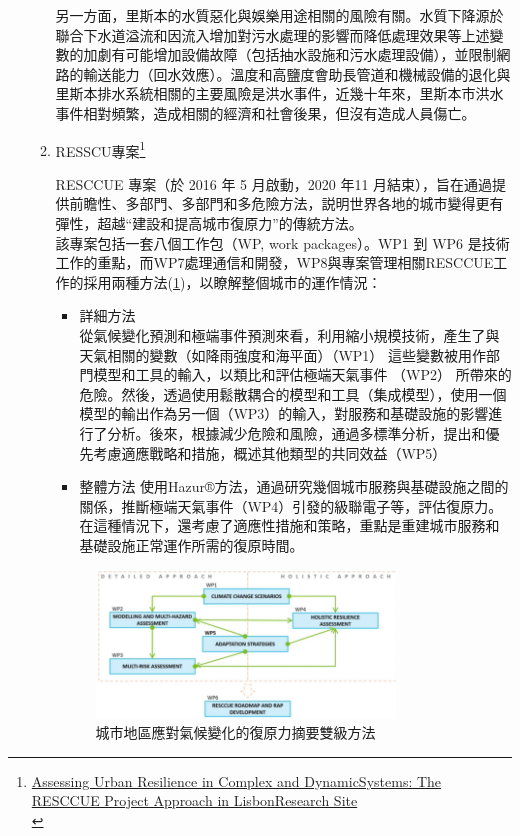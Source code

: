 \documentclass[a4paper,12pt]{article}
\begin{document}
\begin{enumerate}
\begin{enumerate}
另一方面，里斯本的水質惡化與娛樂用途相關的風險有關。水質下降源於聯合下水道溢流和因流入增加對污水處理的影響而降低處理效果等上述變數的加劇有可能增加設備故障（包括抽水設施和污水處理設備），並限制網路的輸送能力（回水效應）。溫度和高鹽度會助長管道和機械設備的退化與里斯本排水系統相關的主要風險是洪水事件，近幾十年來，里斯本市洪水事件相對頻繁，造成相關的經濟和社會後果，但沒有造成人員傷亡。\\
\item RESSCU專案\footnote{\href{https://www.google.com/url?sa=t\&rct=j\&q=\&esrc=s\&source=web\&cd=\&ved=2ahUKEwikleO6gdDvAhW0JaYKHWrkBoIQFjAEegQIAhAD\&url=https\%3A\%2F\%2Fwww.mdpi.com\%2F2071-1050\%2F12\%2F21\%2F8931\%2Fpdf\&usg=AOvVaw1QA1hhOGw26SQiir9XhUi2}{Assessing Urban Resilience in Complex and DynamicSystems: The RESCCUE Project Approach in LisbonResearch Site}\\}
\label{sec:org8e48f22}

RESCCUE 專案（於 2016 年 5 月啟動，2020 年11 月結束），旨在通過提供前瞻性、多部門、多部門和多危險方法，説明世界各地的城市變得更有彈性，超越``建設和提高城市復原力''的傳統方法。\\

該專案包括一套八個工作包（WP, work packages）。WP1 到 WP6 是技術工作的重點，而WP7處理通信和開發，WP8與專案管理相關RESCCUE工作的採用兩種方法(\ref{fig:Lisbon-WPs})，以瞭解整個城市的運作情況：\\
\begin{itemize}
\item 詳細方法\\
從氣候變化預測和極端事件預測來看，利用縮小規模技術，產生了與天氣相關的變數（如降雨強度和海平面）（WP1） 這些變數被用作部門模型和工具的輸入，以類比和評估極端天氣事件 （WP2） 所帶來的危險。然後，透過使用鬆散耦合的模型和工具（集成模型），使用一個模型的輸出作為另一個（WP3）的輸入，對服務和基礎設施的影響進行了分析。後來，根據減少危險和風險，通過多標準分析，提出和優先考慮適應戰略和措施，概述其他類型的共同效益（WP5）\\
\item 整體方法  使用Hazur®方法，通過研究幾個城市服務與基礎設施之間的關係，推斷極端天氣事件（WP4）引發的級聯電子等，評估復原力。在這種情況下，還考慮了適應性措施和策略，重點是重建城市服務和基礎設施正常運作所需的復原時間。\\
\end{itemize}
\begin{figure}[htbp]
\centering
\includegraphics[width=300]{images/blwp.png}
\caption{\label{fig:Lisbon-WPs}城市地區應對氣候變化的復原力摘要雙級方法}
\end{figure}


\end{enumerate}
\end{enumerate}
\end{document}
